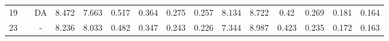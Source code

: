 \begin{table}
\begin{tabular}{@{\hskip3pt}c@{\hskip3pt}c@{\hskip3pt}c@{\hskip3pt}c@{\hskip3pt}c@{\hskip3pt}c@{\hskip3pt}c@{\hskip3pt}c@{\hskip3pt}c@{\hskip3pt}c@{\hskip3pt}c@{\hskip3pt}c@{\hskip3pt}c@{\hskip3pt}c@{\hskip3pt}c}
         19 &            &                  DA &             8.472 &          7.663 &           0.517 &           0.364 &  0.275 &           0.257 &               8.134 &           8.722 &            0.42 &           0.269 &          0.181 &           0.164 \\
         23 &            &                     - &             8.236 &          8.033 &           0.482 &           0.347 &           0.243 &           0.226 &               7.344 &           8.987 &           0.423 &           0.235 &          0.172 &           0.163 \\
\bottomrule
\end{tabular}
\end{table}
